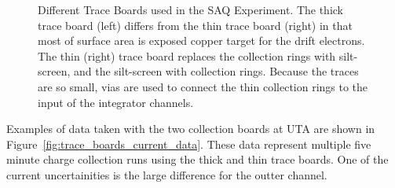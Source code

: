 \begin{figure}[]
\begin{subfigure}{.45\textwidth}
  \caption{}
\end{subfigure}
\caption{Different Trace Boards used in the SAQ Experiment.
The thick trace board (left) differs from the thin trace board (right) in that most of surface area is exposed copper target for the drift electrons.
The thin (right) trace board replaces the collection rings with silt-screen, and the silt-screen with collection rings.
Because the traces are so small, vias are used to connect the thin collection rings to the input of the integrator channels.
}
\label{fig:trace_boards}
\end{figure}

Examples of data taken with the two collection boards at UTA are shown in Figure~\ref{fig:trace_boards_current_data}.
These data represent multiple five minute charge collection runs using the thick and thin trace boards.
One of the current uncertainities is the large difference for the outter channel.

